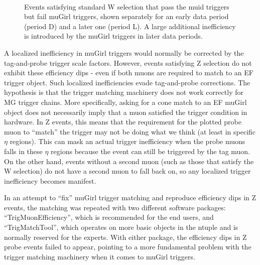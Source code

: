 \begin{figure}[phtb]
  \begin{center}
         \\
 \caption{ Events satisfying standard W selection that pass the muid triggers but fail muGirl triggers, shown separately for an early data period (period D) and a later one (period L). A large additional inefficiency is introduced by the muGirl triggers in later data periods. }
 \label{fig:Wmunu:AC_MGvsMU}
 \end{center}
\end{figure}

A localized inefficiency in muGirl triggers would normally be corrected by the tag-and-probe trigger scale factors. However, events satisfying Z selection do not exhibit these efficiency dips - even if both muons are required to match to an EF trigger object. Such localized inefficiencies evade tag-and-probe corrections. The hypothesis is that the trigger matching machinery does not work correctly for MG trigger chains. More specifically, asking for a cone match to an EF muGirl object does not necessarily imply that a muon satisfied the trigger condition in hardware. In Z events, this means that the requirement for the plotted probe muon to ``match'' the trigger may not be doing what we think (at least in specific $\eta$ regions). This can mask an actual trigger inefficiency when the probe muons falls in these $\eta$ regions because the event can still be triggered by the tag muon. On the other hand, events without a second muon (such as those that satisfy the W selection) do not have a second muon to fall back on, so any localized trigger inefficiency becomes manifest.

In an attempt to ``fix'' muGirl trigger matching and reproduce efficiency dips in Z events, the matching was repeated with two different software packages: ``TrigMuonEfficiency'', which is recommended for the end users, and ``TrigMatchTool'', which operates on more basic objects in the ntuple and is normally reserved for the experts. With either package, the efficiency dips in Z probe events failed to appear, pointing to a more fundamental problem with the trigger matching machinery when it comes to muGirl triggers.

